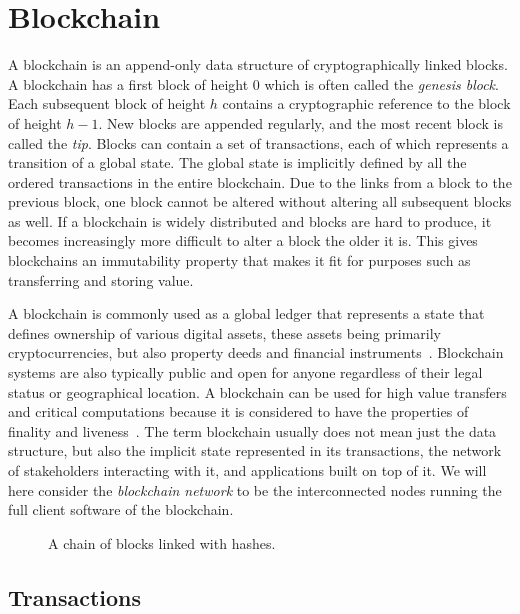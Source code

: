\section{Blockchain}
\label{sec:blockchain}

A blockchain is an append-only data structure of cryptographically linked blocks. A blockchain has a first block of height $0$ which is often called the \emph{genesis block}. Each subsequent block of height $h$ contains a cryptographic reference to the block of height $h-1$. New blocks are appended regularly, and the most recent block is called the \emph{tip}. Blocks can contain a set of transactions, each of which represents a transition of a global state. The global state is implicitly defined by all the ordered transactions in the entire blockchain. Due to the links from a block to the previous block, one block cannot be altered without altering all subsequent blocks as well. If a blockchain is widely distributed and blocks are hard to produce, it becomes increasingly more difficult to alter a block the older it is. This gives blockchains an immutability property that makes it fit for purposes such as transferring and storing value.

A blockchain is commonly used as a global ledger that represents a state that defines ownership of various digital assets, these assets being primarily cryptocurrencies, but also property deeds and financial instruments~\cite{tschorsch_bitcoin_2016}. Blockchain systems are also typically public and open for anyone regardless of their legal status or geographical location. A blockchain can be used for high value transfers and critical computations because it is considered to have the properties of finality and liveness~\cite{garay_bitcoin_2015}. 
The term blockchain usually does not mean just the data structure, but also the implicit state represented in its transactions, the network of stakeholders interacting with it, and applications built on top of it. We will here consider the \emph{blockchain network} to be the interconnected nodes running the full client software of the blockchain.

\begin{figure}[htbp]
  \centering
  
  \caption{A chain of blocks linked with hashes.}
  \label{fig:blockchain}
\end{figure}

\subsection{Transactions}


